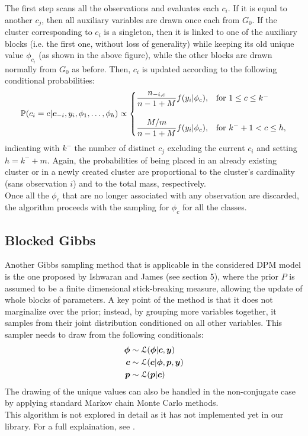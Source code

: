 The first step scans all the observations and evaluates each $c_i$.
If it is equal to another $c_j$, then all auxiliary variables are drawn once each from $G_0$.
If the cluster corresponding to $c_i$ is a singleton, then it is linked to one of the auxiliary blocks (i.e. the first one, without loss of generality) while keeping its old unique value $\phi_{c_i}$ (as shown in the above figure), while the other blocks are drawn normally from $G_0$ as before.
Then, $c_i$ is updated according to the following conditional probabilities:
\begin{equation}
	\begin{aligned} \label{neal8prob}
		\mathbb P(c_{i}=c | \boldsymbol c_{-i}, y_{i}, \phi_{1},\dots,\phi_{h}) \propto
		\begin{cases}
			\dfrac{n_{-i,c}}{n-1+M}f(y_{i}|\phi_{c}), & \mbox{for } 1 \leq c \leq k^{-} \\
			\\
			\dfrac{M/m}{n-1+M}f(y_{i}|\phi_{c}), & \mbox{for } k^{-}+1 < c \leq h,
		\end{cases}
	\end{aligned}
\end{equation}
indicating with $k^{-}$ the number of distinct $c_j$ excluding the current $c_i$ and setting $h=k^{-}+m$.
Again, the probabilities of being placed in an already existing cluster or in a newly created cluster are proportional to the cluster's cardinality (sans observation $i$) and to the total mass, respectively. \\
Once all the $\phi_c$ that are no longer associated with any observation are discarded, the algorithm proceeds with the sampling for $\phi_c$ for all the classes.

\subsection{Blocked Gibbs}
Another Gibbs sampling method that is applicable in the considered DPM model is the one proposed by Ishwaran and James (see \cite{james} section 5), where the prior $P$ is assumed to be a finite dimensional stick-breaking measure, allowing the update of whole blocks of parameters.
A key point of the method is that it does not marginalize over the prior; instead, by grouping more variables together, it samples from their joint distribution conditioned on all other variables.
This sampler needs to draw from the following conditionals:
\begin{align}
	\boldsymbol\phi &\sim \mathcal L(\boldsymbol\phi | \boldsymbol{c}, \boldsymbol{y}) \nonumber \\
	\boldsymbol{c} &\sim \mathcal L (\boldsymbol{c}| \boldsymbol\phi,\boldsymbol{p}, \boldsymbol{y}) \nonumber \\
	\boldsymbol{p} &\sim \mathcal L (\boldsymbol{p}| \boldsymbol{c}) \nonumber
\end{align}
The drawing of the unique values can also be handled in the non-conjugate case by applying standard Markov chain Monte Carlo methods. \\
This algorithm is not explored in detail as it has not implemented yet in our library.
For a full explaination, see \cite{james}.
